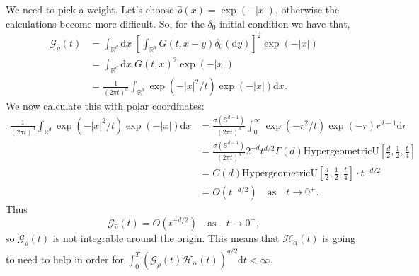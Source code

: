 \documentclass{article}
\numberwithin{equation}{section}
\newcommand{\R}{\mathbb{R}}
\newcommand{\ud}{\ensuremath{\mathrm{d}}}
\begin{document}
We need to pick a weight. Let's choose $\hat\rho(x)=\exp(-|x|)$, otherwise the calculations become more difficult. So, for the $\delta_0$ initial condition we have that,
	\begin{align*}
		\mathcal{G}_{\widehat{\rho}} (t) &= \int_{\R^d} \ud x \; \left[\int_{\R^d} G(t,x-y) \delta_0(\ud y)  \right]^2 \exp(-|x|) \\
		&= \int_{\R^d} \ud x \; G(t,x)^2 \exp(-|x|) \\
		&= \frac{1}{(2 \pi t)^d} \int_{\mathbb R^d} \exp\left(- |x|^2/t\right) \exp(-|x|) \ud x.
	\end{align*}
We now calculate this with polar coordinates:
	\begin{align*}
		\frac{1}{(2 \pi t)^d} \int_{\mathbb R^d} \exp\left(- |x|^2/t\right) \exp(-|x|) \ud x &= \frac{\sigma(\mathbb{S}^{d-1})}{(2 \pi t)^d} \int_0^\infty \exp\left(- r^2/t\right) \exp(-r) r^{d-1}\ud r \\
		&= \frac{\sigma(\mathbb{S}^{d-1})}{(2 \pi t)^d}2^{-d}t^{d/2}\Gamma(d) \text{HypergeometricU}\left[ \frac{d}{2}, \frac{1}{2}, \frac{t}{4} \right] \\
		&= C(d)\text{HypergeometricU}\left[ \frac{d}{2}, \frac{1}{2}, \frac{t}{4} \right] \cdot t^{-d/2} \\
		& = O(t^{-d/2}) \quad \text{as} \quad t \to 0^+.
	\end{align*}
Thus
	\begin{equation} \label{E:Gorigin}
			\mathcal{G}_{\widehat{\rho}} (t)  = O(t^{-d/2}) \quad \text{as} \quad t \to 0^+,
	\end{equation}
so $\mathcal{G_{\rho}}(t)$ is not integrable around the origin. This means that $\mathcal{H}_{\alpha}(t)$ is going to need to help in order for $\int_0^T \left(\mathcal{G}_{\rho}(t) \mathcal{H}_{\alpha}(t)\right)^{q/2} \ud t < \infty$.
\end{document}
